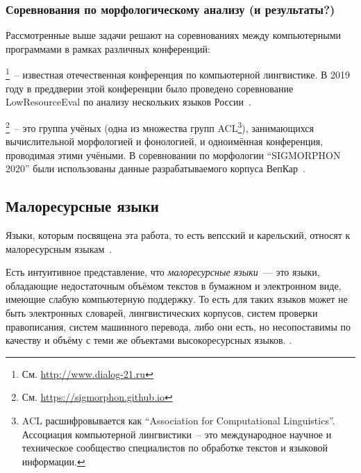 \subsubsection{Соревнования по морфологическому анализу (и результаты?)}

Рассмотренные выше задачи решают на соревнованиях
между компьютерными программами в рамках различных конференций:
\begin{description}[align=left]
    \item [Диалог]\footnote{См. \url{http://www.dialog-21.ru}}~--
            известная отечественная конференция
            по компьютерной лингвистике.
            В 2019 году в преддверии этой конференции
            было проведено соревнование LowResourceEval
            по анализу нескольких языков России~\cite{Klyachko2019LowresourceEval}.

    \item [SIGMORPHON]\label{SIGMORPHON}\footnote{См. \url{https://sigmorphon.github.io}}~--
                это группа учёных (одна из множества групп ACL\footnote{%
                ACL расшифровывается как ``Association for Computational Linguistics''.
                Ассоциация компьютерной лингвистики~-- это
                международное научное и техническое сообщество специалистов
                по обработке текстов и языковой информации.
            }),
            занимающихся вычислительной морфологией и фонологией,
            и одноимённая конференция, проводимая этими учёными.
            В соревновании по морфологии ``SIGMORPHON 2020''
            были использованы данные
            разрабатываемого корпуса ВепКар~\cite{Vylomova2020SIGMORPHON}.

\end{description}



\subsection{Малоресурсные языки}\label{sect_low-resource}

Языки, которым посвящена эта работа, то есть вепсский и карельский,
относят к малоресурсным языкам~.

Есть интуитивное представление, что \emph{малоресурсные языки}~---
это языки, обладающие недостаточным объёмом текстов
в бумажном и электронном виде,
имеющие слабую компьютерную поддержку.
То есть для таких языков может не быть
электронных словарей, лингвистических корпусов,
систем проверки правописания, систем машинного перевода,
либо они есть, но несопоставимы по качеству и объёму с теми же объектами
высокоресурсных языков.
.

